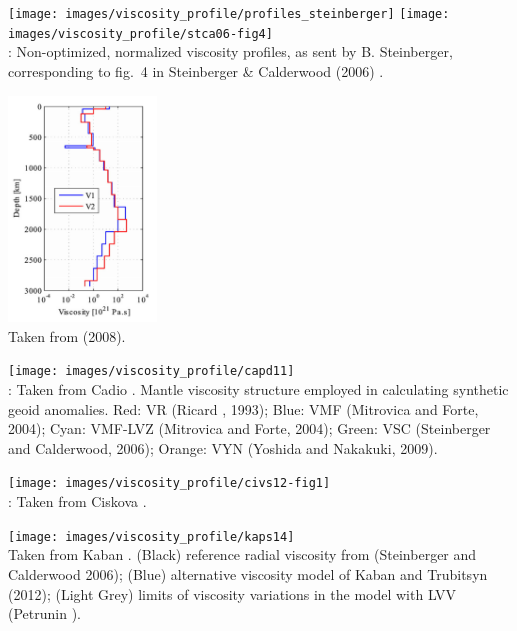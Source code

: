 \begin{center}
\texttt{[image: images/viscosity\_profile/profiles\_steinberger]}
\texttt{[image: images/viscosity\_profile/stca06-fig4]}\\
{\captionfont \twothousandsix:
Non-optimized, normalized viscosity profiles, as sent by B. Steinberger,
corresponding to fig.~4 in Steinberger \& Calderwood (2006) \cite{stca06}.}
\end{center}

\begin{center}
\includegraphics[height=6cm]{images/viscosity_profile/mofm08}\\
{\captionfont Taken from \textcite{mofm08} (2008).}
\end{center}


\begin{center}
\texttt{[image: images/viscosity\_profile/capd11]}\\
{\captionfont \twothousandeleven: Taken from Cadio \etal \cite{capd11}.
Mantle viscosity structure employed in calculating synthetic geoid anomalies. 
Red: VR (Ricard \etal, 1993); Blue: VMF (Mitrovica and Forte, 2004); Cyan: VMF-LVZ (Mitrovica
and Forte, 2004); Green: VSC (Steinberger and Calderwood, 2006); Orange: VYN (Yoshida and Nakakuki, 2009).}
\end{center}

\begin{center}
\texttt{[image: images/viscosity\_profile/civs12-fig1]}\\
{\captionfont \twothousandtwelve: Taken from Ciskova \etal \cite{civs12}.}
\end{center}

\begin{center}
\texttt{[image: images/viscosity\_profile/kaps14]}\\
{\captionfont \twothousandfourteen Taken from Kaban \etal  \cite{kaps14}.
(Black) reference radial viscosity from (Steinberger and Calderwood 2006); 
(Blue) alternative viscosity model of Kaban and Trubitsyn (2012); 
(Light Grey) limits of viscosity variations in the model with LVV (Petrunin ).
}
\end{center}

